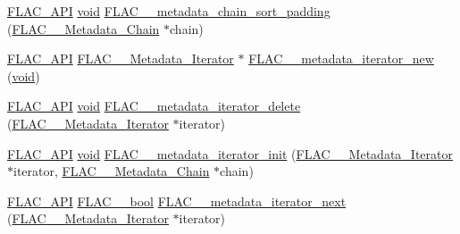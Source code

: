 \begin{DoxyCompactItemize}
\mbox{\hyperlink{group__flac__export_ga56ca07df8a23310707732b1c0007d6f5}{F\+L\+A\+C\+\_\+\+A\+PI}} \mbox{\hyperlink{_s_d_l__opengles2__gl2ext_8h_ae5d8fa23ad07c48bb609509eae494c95}{void}} \mbox{\hyperlink{group__flac__metadata__level2_gaa14304da1c8e706808cfafa5cbbf575b}{F\+L\+A\+C\+\_\+\+\_\+metadata\+\_\+chain\+\_\+sort\+\_\+padding}} (\mbox{\hyperlink{group__flac__metadata__level2_gaec6993c60b88f222a52af86f8f47bfdf}{F\+L\+A\+C\+\_\+\+\_\+\+Metadata\+\_\+\+Chain}} $\ast$chain)
\item 
\mbox{\hyperlink{group__flac__export_ga56ca07df8a23310707732b1c0007d6f5}{F\+L\+A\+C\+\_\+\+A\+PI}} \mbox{\hyperlink{group__flac__metadata__level2_ga9f3e135a07cdef7e51597646aa7b89b2}{F\+L\+A\+C\+\_\+\+\_\+\+Metadata\+\_\+\+Iterator}} $\ast$ \mbox{\hyperlink{group__flac__metadata__level2_gac988906d63bd2ddc910d8f0b118591f7}{F\+L\+A\+C\+\_\+\+\_\+metadata\+\_\+iterator\+\_\+new}} (\mbox{\hyperlink{_s_d_l__opengles2__gl2ext_8h_ae5d8fa23ad07c48bb609509eae494c95}{void}})
\item 
\mbox{\hyperlink{group__flac__export_ga56ca07df8a23310707732b1c0007d6f5}{F\+L\+A\+C\+\_\+\+A\+PI}} \mbox{\hyperlink{_s_d_l__opengles2__gl2ext_8h_ae5d8fa23ad07c48bb609509eae494c95}{void}} \mbox{\hyperlink{group__flac__metadata__level2_ga1af713d0ae3f7b761579b4fac64f0a9e}{F\+L\+A\+C\+\_\+\+\_\+metadata\+\_\+iterator\+\_\+delete}} (\mbox{\hyperlink{group__flac__metadata__level2_ga9f3e135a07cdef7e51597646aa7b89b2}{F\+L\+A\+C\+\_\+\+\_\+\+Metadata\+\_\+\+Iterator}} $\ast$iterator)
\item 
\mbox{\hyperlink{group__flac__export_ga56ca07df8a23310707732b1c0007d6f5}{F\+L\+A\+C\+\_\+\+A\+PI}} \mbox{\hyperlink{_s_d_l__opengles2__gl2ext_8h_ae5d8fa23ad07c48bb609509eae494c95}{void}} \mbox{\hyperlink{group__flac__metadata__level2_ga4a5af69a1f19436b02f738eb8c97c959}{F\+L\+A\+C\+\_\+\+\_\+metadata\+\_\+iterator\+\_\+init}} (\mbox{\hyperlink{group__flac__metadata__level2_ga9f3e135a07cdef7e51597646aa7b89b2}{F\+L\+A\+C\+\_\+\+\_\+\+Metadata\+\_\+\+Iterator}} $\ast$iterator, \mbox{\hyperlink{group__flac__metadata__level2_gaec6993c60b88f222a52af86f8f47bfdf}{F\+L\+A\+C\+\_\+\+\_\+\+Metadata\+\_\+\+Chain}} $\ast$chain)
\item 
\mbox{\hyperlink{group__flac__export_ga56ca07df8a23310707732b1c0007d6f5}{F\+L\+A\+C\+\_\+\+A\+PI}} \mbox{\hyperlink{ordinals_8h_a95103469f1cbd78b8cf250194985b34e}{F\+L\+A\+C\+\_\+\+\_\+bool}} \mbox{\hyperlink{group__flac__metadata__level2_ga3997509ae7eeea3b208700cdbbbd97ed}{F\+L\+A\+C\+\_\+\+\_\+metadata\+\_\+iterator\+\_\+next}} (\mbox{\hyperlink{group__flac__metadata__level2_ga9f3e135a07cdef7e51597646aa7b89b2}{F\+L\+A\+C\+\_\+\+\_\+\+Metadata\+\_\+\+Iterator}} $\ast$iterator)

\end{DoxyCompactItemize}
